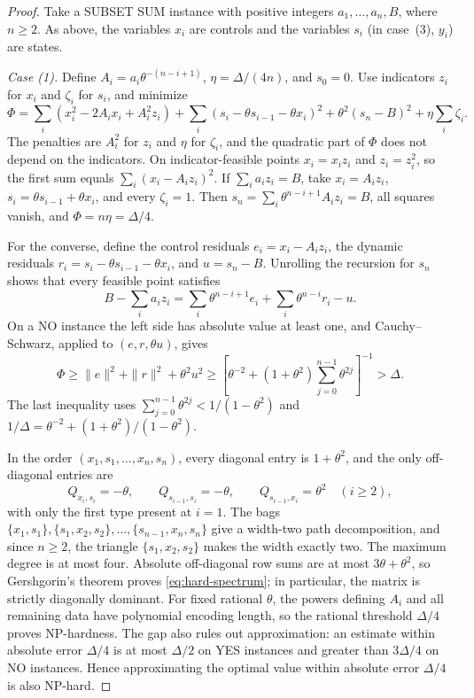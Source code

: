 \begin{proof}
Take a SUBSET SUM instance with positive integers $a_1,\ldots,a_n,B$,
where $n\ge2$. As above, the variables $x_i$ are controls and the
variables $s_i$ (in case~(3), $y_i$) are states.

\emph{Case (1).} Define $A_i=a_i\theta^{-(n-i+1)}$, $\eta=\Delta/(4n)$,
and $s_0=0$. Use indicators $z_i$ for $x_i$ and $\zeta_i$ for $s_i$, and
minimize
\begin{equation}\label{eq:hard-objective}
 \Phi=\sum_i(x_i^2-2A_ix_i+A_i^2z_i)
   +\sum_i(s_i-\theta s_{i-1}-\theta x_i)^2
   +\theta^2(s_n-B)^2+\eta\sum_i\zeta_i.
\end{equation}
The penalties are $A_i^2$ for $z_i$ and $\eta$ for $\zeta_i$, and the
quadratic part of $\Phi$ does not depend on the indicators. On
indicator-feasible points $x_i=x_iz_i$ and $z_i=z_i^2$, so the first sum
equals $\sum_i(x_i-A_iz_i)^2$. If $\sum_i a_i z_i=B$, take
$x_i=A_i z_i$, $s_i=\theta s_{i-1}+\theta x_i$, and every $\zeta_i=1$.
Then $s_n=\sum_i\theta^{n-i+1}A_iz_i=B$, all squares vanish, and
$\Phi=n\eta=\Delta/4$.

For the converse, define the control residuals $e_i=x_i-A_i z_i$, the
dynamic residuals $r_i=s_i-\theta s_{i-1}-\theta x_i$, and $u=s_n-B$.
Unrolling the recursion for $s_n$ shows that every feasible point
satisfies
\[
 B-\sum_i a_i z_i
 =\sum_i\theta^{n-i+1}e_i+\sum_i\theta^{n-i}r_i-u.
\]
On a NO instance the left side has absolute value at least one, and
Cauchy--Schwarz, applied to $(e,r,\theta u)$, gives
\[
 \Phi\ge\|e\|^2+\|r\|^2+\theta^2u^2
 \ge\left[\theta^{-2}+(1+\theta^2)
                    \sum_{j=0}^{n-1}\theta^{2j}\right]^{-1}>\Delta.
\]
The last inequality uses $\sum_{j=0}^{n-1}\theta^{2j}<1/(1-\theta^2)$
and $1/\Delta=\theta^{-2}+(1+\theta^2)/(1-\theta^2)$.

In the order $(x_1,s_1,\ldots,x_n,s_n)$, every diagonal entry is
$1+\theta^2$, and the only off-diagonal entries are
\begin{equation}\label{eq:hard-edges}
 Q_{x_i,s_i}=-\theta,\qquad
 Q_{s_{i-1},s_i}=-\theta,\qquad
 Q_{s_{i-1},x_i}=\theta^2\quad(i\ge2),
\end{equation}
with only the first type present at $i=1$. The bags
$\{x_1,s_1\},\{s_1,x_2,s_2\},\ldots,\{s_{n-1},x_n,s_n\}$
give a width-two path decomposition, and since $n\ge2$, the triangle
$\{s_1,x_2,s_2\}$ makes the width exactly two. The maximum degree is at
most four. Absolute off-diagonal row sums are at most $3\theta+\theta^2$,
so Gershgorin's theorem proves \eqref{eq:hard-spectrum}; in particular,
the matrix is strictly diagonally dominant. For fixed rational $\theta$,
the powers defining $A_i$ and all remaining data have polynomial
encoding length, so the rational threshold $\Delta/4$ proves
NP-hardness. The gap also rules out approximation: an estimate within
absolute error $\Delta/4$ is at most $\Delta/2$ on YES instances and
greater than $3\Delta/4$ on NO instances. Hence approximating the
optimal value within absolute error $\Delta/4$ is also NP-hard.


\end{proof}
